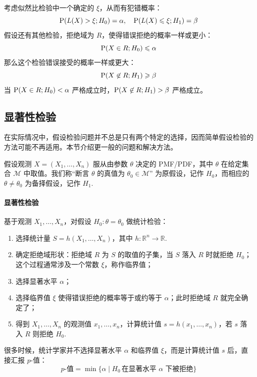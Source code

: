 \begin{lemma}
考虑似然比检验中一个确定的 $\xi$，从而有犯错概率：
\[
\mathrm{P}(L(X)>\xi;H_0)=\alpha,\quad\mathrm{P}(L(X)\leqslant\xi;H_1)=\beta
\]
假设还有其他检验，拒绝域为 $R$，使得错误拒绝的概率一样或更小：
\[
\mathrm{P}(X\in R;H_0)\leqslant\alpha
\]
那么这个检验错误接受的概率一样或更大：
\[
\mathrm{P}(X\not\in R;H_1)\geqslant\beta
\]
当 $\mathrm{P}(X\in R;H_0)<\alpha$ 严格成立时，$\mathrm{P}(X\not\in R;H_1)>\beta$ 严格成立。
\end{lemma}


\subsection{显著性检验}

在实际情况中，假设检验问题并不总是只有两个特定的选择，因而简单假设检验的方法可能不再适用。本节介绍更一般的问题和解决方法。

假设观测 $X=(X_1,\ldots,X_n)$ 服从由参数 $\theta$ 决定的 PMF/PDF，其中 $\theta$ 在给定集合 $\mathcal M$ 中取值。我们称“断言 $\theta$ 的真值为 $\theta_0\in\mathcal M$” 为原假设，记作 $H_0$，而相应的 $\theta\neq\theta_0$ 为备择假设，记作 $H_1$.

\paragraph{显著性检验}
基于观测 $X_1,\ldots,X_n$，对假设 $H_0:\theta=\theta_0$ 做统计检验：
\begin{enumerate}
    \item 选择统计量 $S=h(X_1,\ldots,X_n)$，其中 $h:\mathbb R^n\to\mathbb R$.
    \item 确定拒绝域形状：拒绝域 $R$ 为 $S$ 的取值的子集，当 $S$ 落入 $R$ 时就拒绝 $H_0$；这个过程通常涉及一个常数 $\xi$，称作临界值；
    \item 选择显著水平 $\alpha$；
    \item 选择临界值 $\xi$ 使得错误拒绝的概率等于或约等于 $\alpha$；此时拒绝域 $R$ 就完全确定了；
    \item 得到 $X_1,\ldots,X_n$ 的观测值 $x_1,\ldots,x_n$，计算统计值 $s=h(x_1,\ldots,x_n)$，若 $s$ 落入 $R$ 则拒绝 $H_0$.
\end{enumerate}

\begin{com}
很多时候，统计学家并不选择显著水平 $\alpha$ 和临界值 $\xi$，而是计算统计值 $s$ 后，直接汇报 $p$-值：
\[
    p\text{-值}=\min\{\alpha\mid H_0\,\text{在显著水平 $\alpha$ 下被拒绝}\}
\]
\end{com}

